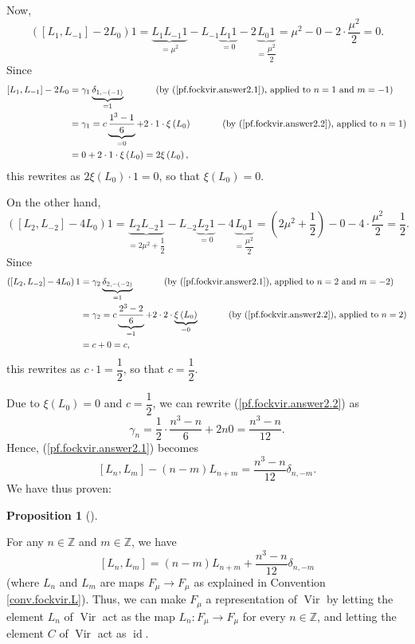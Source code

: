 \documentclass
[numbers=enddot,12pt,final,onecolumn,german,notitlepage]{scrartcl}%
\theoremstyle{definition}
\newtheorem{prop}[theo]{Proposition}
\newenvironment{proposition}[1][]
{\begin{prop}[#1]\begin{leftbar}}
{\end{leftbar}\end{prop}}
\begin{document}
Now,%
\[
\left(  \left[  L_{1},L_{-1}\right]  -2L_{0}\right)  1=\underbrace{L_{1}%
L_{-1}1}_{=\mu^{2}}-L_{-1}\underbrace{L_{1}1}_{=0}-2\underbrace{L_{0}%
1}_{=\dfrac{\mu^{2}}{2}}=\mu^{2}-0-2\cdot\dfrac{\mu^{2}}{2}=0.
\]
Since%
\begin{align*}
\left[  L_{1},L_{-1}\right]  -2L_{0}  &  =\gamma_{1}\underbrace{\delta
_{1,-\left(  -1\right)  }}_{=1}\ \ \ \ \ \ \ \ \ \ \left(  \text{by
(\ref{pf.fockvir.answer2.1}), applied to }n=1\text{ and }m=-1\right) \\
&  =\gamma_{1}=c\underbrace{\dfrac{1^{3}-1}{6}}_{=0}+2\cdot1\cdot\xi\left(
L_{0}\right)  \ \ \ \ \ \ \ \ \ \ \left(  \text{by (\ref{pf.fockvir.answer2.2}%
), applied to }n=1\right) \\
&  =0+2\cdot1\cdot\xi\left(  L_{0}\right)  =2\xi\left(  L_{0}\right)  ,
\end{align*}
this rewrites as $2\xi\left(  L_{0}\right)  \cdot1=0$, so that $\xi\left(
L_{0}\right)  =0$.

On the other hand,%
\[
\left(  \left[  L_{2},L_{-2}\right]  -4L_{0}\right)  1=\underbrace{L_{2}%
L_{-2}1}_{=2\mu^{2}+\dfrac{1}{2}}-L_{-2}\underbrace{L_{2}1}_{=0}%
-4\underbrace{L_{0}1}_{=\dfrac{\mu^{2}}{2}}=\left(  2\mu^{2}+\dfrac{1}%
{2}\right)  -0-4\cdot\dfrac{\mu^{2}}{2}=\dfrac{1}{2}.
\]
Since%
\begin{align*}
\left(  \left[  L_{2},L_{-2}\right]  -4L_{0}\right)  1  &  =\gamma
_{2}\underbrace{\delta_{2,-\left(  -2\right)  }}_{=1}%
\ \ \ \ \ \ \ \ \ \ \left(  \text{by (\ref{pf.fockvir.answer2.1}), applied to
}n=2\text{ and }m=-2\right) \\
&  =\gamma_{2}=c\underbrace{\dfrac{2^{3}-2}{6}}_{=1}+2\cdot2\cdot
\underbrace{\xi\left(  L_{0}\right)  }_{=0}\ \ \ \ \ \ \ \ \ \ \left(
\text{by (\ref{pf.fockvir.answer2.2}), applied to }n=2\right) \\
&  =c+0=c,
\end{align*}
this rewrites as $c\cdot1=\dfrac{1}{2}$, so that $c=\dfrac{1}{2}$.

Due to $\xi\left(  L_{0}\right)  =0$ and $c=\dfrac{1}{2}$, we can rewrite
(\ref{pf.fockvir.answer2.2}) as
\[
\gamma_{n}=\dfrac{1}{2}\cdot\dfrac{n^{3}-n}{6}+2n0=\dfrac{n^{3}-n}{12}.
\]
Hence, (\ref{pf.fockvir.answer2.1}) becomes%
\[
\left[  L_{n},L_{m}\right]  -\left(  n-m\right)  L_{n+m}=\dfrac{n^{3}-n}%
{12}\delta_{n,-m}.
\]
We have thus proven:

\begin{proposition}
\label{prop.fockvir.answer2}For any $n\in\mathbb{Z}$ and $m\in\mathbb{Z}$, we
have%
\begin{equation}
\left[  L_{n},L_{m}\right]  =\left(  n-m\right)  L_{n+m}+\dfrac{n^{3}-n}%
{12}\delta_{n,-m} \label{prop.fockvir.answer2.form}%
\end{equation}
(where $L_{n}$ and $L_{m}$ are maps $F_{\mu}\rightarrow F_{\mu}$ as explained
in Convention \ref{conv.fockvir.L}). Thus, we can make $F_{\mu}$ a
representation of $\operatorname*{Vir}$ by letting the element $L_{n}$ of
$\operatorname*{Vir}$ act as the map $L_{n}:F_{\mu}\rightarrow F_{\mu}$ for
every $n\in\mathbb{Z}$, and letting the element $C$ of $\operatorname*{Vir}$
act as $\operatorname*{id}$.
\end{proposition}
\end{document}
